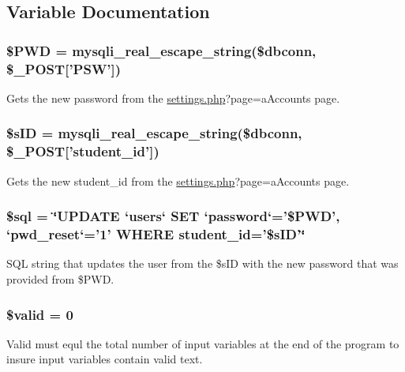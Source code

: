 \subsection{\-Variable \-Documentation}
\hypertarget{studentPReset_8php_ad10f6388800bdf18e795c1afd61faab1}{
\subsubsection[{\$\-P\-W\-D}]{\setlength{\rightskip}{0pt plus 5cm}\$\-P\-W\-D = mysqli\-\_\-real\-\_\-escape\-\_\-string(\$dbconn, \$\-\_\-\-P\-O\-S\-T\mbox{[}'\-P\-S\-W'\mbox{]})}}\label{studentPReset_8php_ad10f6388800bdf18e795c1afd61faab1}
\-Gets the new password from the \hyperlink{settings_8php}{settings.\-php}?page=a\-Accounts page. \hypertarget{studentPReset_8php_a71c1c0263d3e18eab2e45b17e450b2dd}{
\subsubsection[{\$s\-I\-D}]{\setlength{\rightskip}{0pt plus 5cm}\$s\-I\-D = mysqli\-\_\-real\-\_\-escape\-\_\-string(\$dbconn, \$\-\_\-\-P\-O\-S\-T\mbox{[}'student\-\_\-id'\mbox{]})}}\label{studentPReset_8php_a71c1c0263d3e18eab2e45b17e450b2dd}
\-Gets the new student\-\_\-id from the \hyperlink{settings_8php}{settings.\-php}?page=a\-Accounts page. \hypertarget{studentPReset_8php_a047170d6020a882807665812a27e2525}{
\subsubsection[{\$sql}]{\setlength{\rightskip}{0pt plus 5cm}\$sql = \char`\"{}\-U\-P\-D\-A\-T\-E `users` \-S\-E\-T `password`='\$\-P\-W\-D', `pwd\-\_\-reset`='1' \-W\-H\-E\-R\-E student\-\_\-id='\$s\-I\-D'\char`\"{}}}\label{studentPReset_8php_a047170d6020a882807665812a27e2525}
\-S\-Q\-L string that updates the user from the \$s\-I\-D with the new password that was provided from \$\-P\-W\-D. \hypertarget{studentPReset_8php_a0587674d27d00ef497e08e53ccf45bbb}{
\subsubsection[{\$valid}]{\setlength{\rightskip}{0pt plus 5cm}\$valid = 0}}\label{studentPReset_8php_a0587674d27d00ef497e08e53ccf45bbb}
\-Valid must equl the total number of input variables at the end of the program to insure input variables contain valid text. 